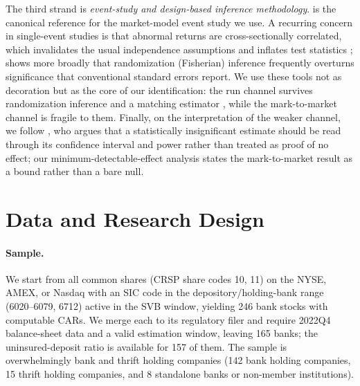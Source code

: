 \documentclass[12pt]{article}
\begin{document}
The third strand is \emph{event-study and design-based inference methodology}.
\citet{mackinlay1997} is the canonical reference for the market-model event study we use.
A recurring concern in single-event studies is that abnormal returns are cross-sectionally
correlated, which invalidates the usual independence assumptions and inflates test statistics
\citep{kolari2010}; \citet{young2019} shows more broadly that randomization (Fisherian)
inference frequently overturns significance that conventional standard errors report. We use
these tools not as decoration but as the core of our identification: the run channel survives
randomization inference and a matching estimator \citep{imbens2004}, while the mark-to-market
channel is fragile to them. Finally, on the interpretation of the weaker channel, we follow
\citet{abadie2020}, who argues that a statistically insignificant estimate should be read
through its confidence interval and power rather than treated as proof of no effect; our
minimum-detectable-effect analysis states the mark-to-market result as a bound rather than a
bare null.

\section{Data and Research Design}\label{sec:data}
\paragraph{Sample.} We start from all common shares (CRSP share codes 10, 11) on the NYSE,
AMEX, or Nasdaq with an SIC code in the depository/holding-bank range (6020--6079, 6712)
active in the SVB window, yielding 246 bank stocks with computable CARs. We merge each to its
regulatory filer and require 2022Q4 balance-sheet data and a valid estimation window, leaving
165 banks; the uninsured-deposit ratio is available for 157 of them. The sample is
overwhelmingly bank and thrift holding companies (142 bank holding companies, 15 thrift
holding companies, and 8 standalone banks or non-member institutions).
\end{document}
